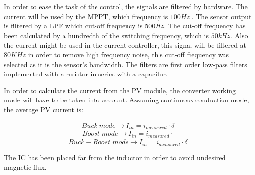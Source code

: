 In order to ease the task of the control, the signals are filtered by hardware. The current will be used by the MPPT, which frequency is $100 Hz$ . The sensor output is filtered by a LPF  which cut-off frequency is $500 Hz$. The cut-off frequency has been calculated by a hundredth of the switching frequency, which is $50 kHz$. Also the current might be used in the current controller, this signal will be filtered at $80 KHz$ in order to remove high frequency noise, this cut-off frequency was selected as it is the sensor's bandwidth. The filters are first order low-pass filters implemented with a resistor in series with a capacitor.

In order to calculate the current from the PV module, the converter working mode will have to be taken into account. Assuming continuous conduction mode, the average PV current is:


\begin{equation} 
	Buck \; mode \rightarrow \overline{I_{in}} = i_{measured} \cdot \delta
\end{equation}
\begin{equation} 
Boost \; mode \rightarrow \overline{I_{in}} = i_{measured} \cdot
\end{equation}
\begin{equation} 
Buck-Boost \; mode \rightarrow \overline{I_{in}} = i_{measured} \cdot \delta
\end{equation}

 The IC has been placed far from the inductor in order to avoid undesired magnetic flux.

